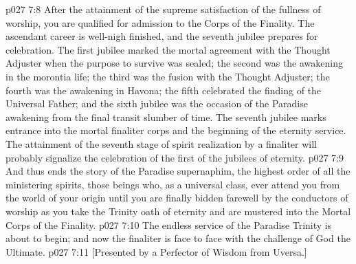 \vs p027 7:8 \pc After the attainment of the supreme satisfaction of the fullness of worship, you are qualified for admission to the Corps of the Finality. The ascendant career is well\hyp{}nigh finished, and the seventh jubilee prepares for celebration. The first jubilee marked the mortal agreement with the Thought Adjuster when the purpose to survive was sealed; the second was the awakening in the morontia life; the third was the fusion with the Thought Adjuster; the fourth was the awakening in Havona; the fifth celebrated the finding of the Universal Father; and the sixth jubilee was the occasion of the Paradise awakening from the final transit slumber of time. The seventh jubilee marks entrance into the mortal finaliter corps and the beginning of the eternity service. The attainment of the seventh stage of spirit realization by a finaliter will probably signalize the celebration of the first of the jubilees of eternity.
\vs p027 7:9 \pc And thus ends the story of the Paradise supernaphim, the highest order of all the ministering spirits, those beings who, as a universal class, ever attend you from the world of your origin until you are finally bidden farewell by the conductors of worship as you take the Trinity oath of eternity and are mustered into the Mortal Corps of the Finality.
\vs p027 7:10 The endless service of the Paradise Trinity is about to begin; and now the finaliter is face to face with the challenge of God the Ultimate.
\vsetoff
\vs p027 7:11 [Presented by a Perfector of Wisdom from Uversa.]

